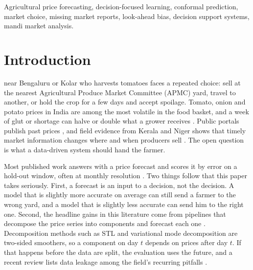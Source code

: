 \documentclass{ieeeaccess}
\begin{document}
\begin{keywords}
Agricultural price forecasting, decision-focused learning, conformal prediction, market choice, missing market reports, look-ahead bias, decision support systems, mandi market analysis.
\end{keywords}

\titlepgskip=-15pt

\maketitle

\section{Introduction}
 near Bengaluru or Kolar who harvests tomatoes faces a repeated choice: sell at the nearest Agricultural Produce Market Committee (APMC) yard, travel to another, or hold the crop for a few days and accept spoilage. Tomato, onion and potato prices in India are among the most volatile in the food basket, and a week of glut or shortage can halve or double what a grower receives \cite{birthal2019}. Public portals publish past prices \cite{agmarknet}, and field evidence from Kerala and Niger shows that timely market information changes where and when producers sell \cite{jensen2007,aker2010}. The open question is what a data-driven system should hand the farmer.

Most published work answers with a price forecast and scores it by error on a hold-out window, often at monthly resolution \cite{ray2023,meena2024,jha2014}. Two things follow that this paper takes seriously. First, a forecast is an input to a decision, not the decision. A model that is slightly more accurate on average can still send a farmer to the wrong yard, and a model that is slightly less accurate can send him to the right one. Second, the headline gains in this literature come from pipelines that decompose the price series into components and forecast each one \cite{sathe2025,celik2025}. Decomposition methods such as STL and variational mode decomposition are two-sided smoothers, so a component on day $t$ depends on prices after day $t$. If that happens before the data are split, the evaluation uses the future, and a recent review lists data leakage among the field's recurring pitfalls \cite{wu2026}.
\end{document}
